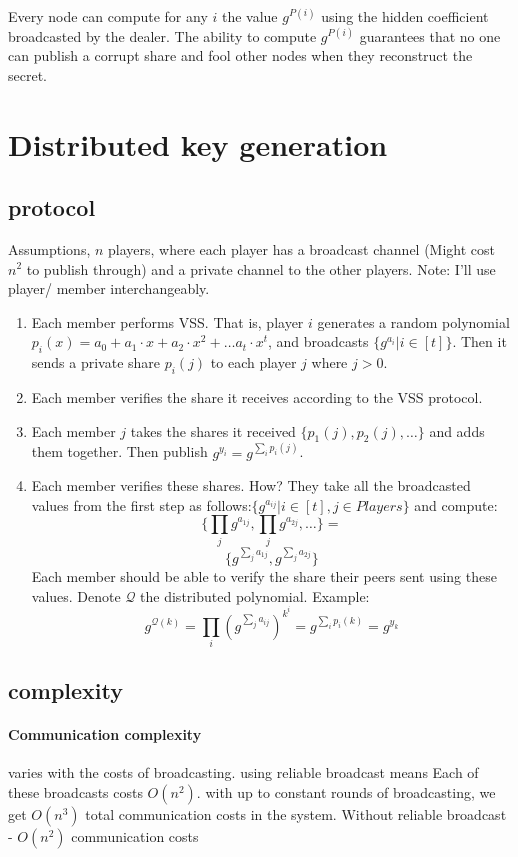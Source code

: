 Every node can compute for any $i$ the value $g^{P(i)}$ using the hidden coefficient broadcasted by the dealer.  
The ability to compute $g^{P(i)}$ guarantees that no one can publish a corrupt share and fool other nodes when they reconstruct the secret.


\section{Distributed key generation}
\subsection{protocol}
Assumptions, $n$ players, where each player has a broadcast channel (Might cost $n^2$ to publish through) and
a private channel to the other players.
Note: I'll use player/ member interchangeably.
\begin{enumerate}
  \item Each member performs VSS.
  That is, player $i$ generates a random polynomial 
  $p_{i}(x)=a_0+a_1\cdot x +a_2\cdot x^2 +\dots a_t\cdot x^t$, and broadcasts $ \{g^{a_i} | i \in [t]\}$.
  Then it sends a private share $ p_{i}(j)$ to each player $j$ where $j>0$.
  \item Each member verifies the share it receives according to the VSS protocol.
  \item Each member $j$ takes the shares it received $\{p_{1}(j),p_{2}(j),\dots\}$ and adds them together. 
  Then publish $ g^{y_i}=g^{\sum_{i}{p_{i}(j)}}$.
  \item Each member verifies these shares. How? They take all the broadcasted values from the first step
  as follows:$ \{g^{a_{ij}} | i \in [t], j \in Players\}$ and compute:
  $$\{\prod_{j}{ g^{a_{1j}}}, \prod_{j}{ g^{a_{2j}}},\dots\}=$$
  $$\{ g^{\sum_{j}{a_{1j}}}, g^{\sum_{j}{a_{2j}}}\} $$ 
  Each member should be able to verify the share their peers sent using these values.
  Denote $\mathcal{Q}$ the distributed polynomial.
  Example:$$g^{\mathcal{Q}(k)}=\prod_{i}(g^{\sum_{j}{a_{ij}}})^{k^i}= g^{\sum_{i}{p_i(k)}}=g^{y_k}$$
\end{enumerate}
\subsection{complexity}
\paragraph{Communication complexity} varies with the costs of broadcasting. using reliable broadcast means
Each of these broadcasts costs $O(n^2)$. with up to constant rounds of broadcasting,
 we get $O(n^3)$ total communication costs in the system. 
 Without reliable broadcast - $O(n^2)$ communication costs
